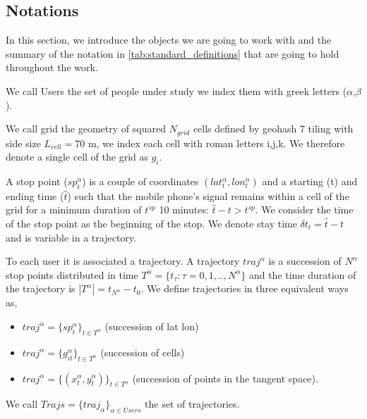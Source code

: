 \documentclass[main.tex]{subfiles}
\begin{document}
\subsection*{Notations}
\label{notations}

In this section, we introduce the objects we are going to work with and the summary of the notation in \ref{tab:standard_definitions} that are going to hold throughout the work.

We call Users the set of people under study we index them with greek letters ($\alpha$,$\beta$).

We call grid the geometry of squared $N_{grid}$ cells  defined by geohash 7 tiling with side size $L_{cell} = 70$ m, we index each cell with roman letters i,j,k. 
We therefore denote a single cell of the grid as $g_i$.

A stop point ($sp_t^{\alpha}$) is a couple of coordinates  $(lat^{\alpha}_t,lon^{\alpha}_t)$ and a starting (t) and ending time ($\hat{t}$) such that the mobile phone's signal remains within a cell of the grid for a minimum duration of $t^{sp}$ 10 minutes: $\hat{t} - t > t^{sp}$. We consider the time of the stop point as the beginning of the stop.
We denote stay time $\delta t_{t} = \hat{t} - t$ and is variable in a trajectory.

To each user it is associated a trajectory. A trajectory  $traj^\alpha$ is a succession of $N^{\alpha}$ stop points distributed in time $T^{\alpha} = \{t_{\tau}: \tau = 0,1,..,N^{\alpha}\}$ and the time duration of the trajectory is $|T^{\alpha}| = t_{N^{\alpha}}-t_0$. We define trajectories in three equivalent ways as,
%
\begin{itemize}
    \item $traj^{\alpha} = \{sp^{\alpha}_t\}_{t \in T^{\alpha}}$ (succession of lat lon)
    \item $traj^{\alpha} = \{g^{\alpha}_{it}\}_{t \in T^{\alpha}}$ (succession of cells)
    \item $traj^{\alpha} = \{(x^{\alpha}_t,y^{\alpha}_t)\}_{t \in T^{\alpha}}$ (succession of points in the tangent space).
\end{itemize}
%
We call $Trajs = \{traj_{\alpha}\}_{\alpha \in Users}$ the set of trajectories.
\end{document}

